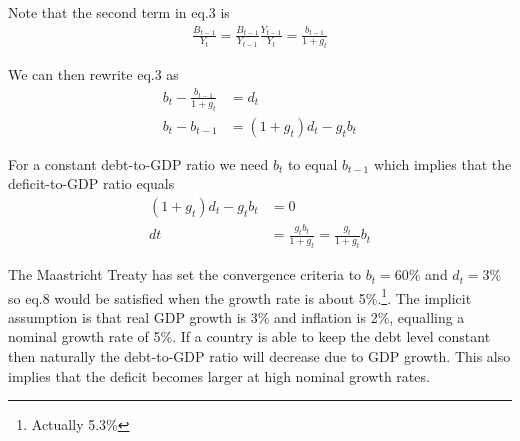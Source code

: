 \documentclass{tufte-handout}
\begin{document}
Note that the second term in eq.3 is
\begin{align}
  \frac{B_{t-1}}{Y_t} = \frac{B_{t-1}}{Y_{t-1}}\frac{Y_{t-1}}{Y_t} = \frac{b_{t-1}}{1+g_t}
\end{align}

We can then rewrite eq.3 as
\begin{align}
  b_t-\frac{b_{t-1}}{1+g_t} &= d_t\\
  b_t-b_{t-1} &= (1+g_t)d_t-g_tb_t
\end{align}

For a constant debt-to-GDP ratio we need $b_t$ to equal $b_{t-1}$ which implies that the deficit-to-GDP ratio equals
\begin{align}
  (1+g_t)d_t-g_tb_t &=0 \\
  dt &= \frac{g_tb_t}{1+g_t} = \frac{g_t}{1+g_t}b_t
\end{align}

The Maastricht Treaty has set the convergence criteria to $b_t=60\%$ and $d_t=3\%$ so eq.8 would be satisfied when the growth rate is about 5\%.\footnote{Actually 5.3\%}.
The implicit assumption is that real GDP growth is 3\% and inflation is 2\%, equalling a nominal growth rate of 5\%. 
If a country is able to keep the debt level constant then naturally the debt-to-GDP ratio will decrease due to GDP growth. 
This also implies that the deficit becomes larger at high nominal growth rates. 

\clearpage
\end{document}
